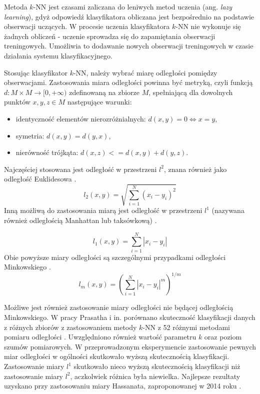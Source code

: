 \documentclass[notitlepage]{report}
\begin{document}
Metoda $k$-NN jest czasami zaliczana do leniwych metod uczenia (ang. \textit{lazy learning}), gdyż odpowiedź klasyfikatora obliczana jest bezpośrednio na podstawie obserwacji uczących. W procesie uczenia klasyfikatora $k$-NN nie wykonuje się żadnych obliczeń - uczenie sprowadza się do zapamiętania obserwacji treningowych. Umożliwia to dodawanie nowych obserwacji treningowych w czasie działania systemu klasyfikacyjnego.

Stosując klasyfikator $k$-NN, należy wybrać miarę odległości pomiędzy obserwacjami. Zastosowania miara odległości powinna być metryką, czyli funkcją $d:M\times M \rightarrow [0,+\infty) $ zdefinowaną na zbiorze $M$, spełniającą dla dowolnych punktów $x,y,z \in M$ następujące warunki:
\begin{itemize}
	\item identyczność elementów nierozróżnialnych: $d(x,y) = 0 \iff x=y$,
	\item symetria: $d(x,y) = d(y,x)$,
	\item nierówność trójkąta: $d(x,z) <= d(x,y) + d(y,z)$.
\end{itemize}

Najczęściej stosowana jest odległość w przestrzeni $l^2$, znana również jako odległość Euklidesowa \cite{prasath}.
\begin{equation}
l_2(x,y) = \sqrt{\sum_{i=1}^{N}(x_i-y_i)^2}
\end{equation}
Inną możliwą do zastosowania miarą jest odległość w przestrzeni $l^1$ (nazywana również odległością Manhattan lub taksówkową) \cite{prasath}. 

\begin{equation}
l_1(x,y) = \sum_{i=1}^{N}|x_i-y_i|
\end{equation}
Obie powyższe miary odległości są szczególnymi przypadkami odległości Minkowskiego \cite{lu} \cite{prasath}.
\begin{equation}
l_m(x,y) = \left(\sum_{i=1}^{N}|x_i-y_i|^m\right)^{1/m}
\end{equation}

Możliwe jest również zastosowanie miary odległości nie będącej odległością Minkowskiego. W pracy Prasatha i in. porównano skuteczność klasyfikacji danych z różnych zbiorów z zastosowaniem metody $k$-NN z 52 różnymi metodami pomiaru odległości \cite{prasath}. Uwzględniono również wartość parametru $k$ oraz poziom szumów pomiarowych. W przeprowadzonym eksperymencie zastosowanie pewnych miar odległości w ogólności skutkowało wyższą skutecznością klasyfikacji. Zastosowanie miary $l^1$ skutkowało nieco wyższą skutecznością klasyfikacji niż zastosowanie miary $l^2$, aczkolwiek różnica była niewielka. Najlepsze rezultaty uzyskano przy zastosowaniu miary Hassanata, zaproponowanej w 2014 roku \cite{hassanat}.
\end{document}
